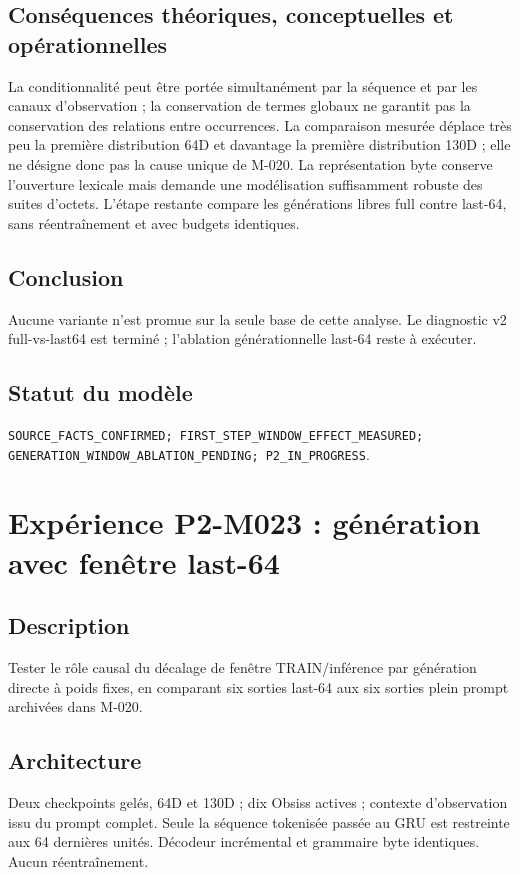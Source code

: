 \documentclass[11pt,a4paper]{report}
\begin{document}
\subsection*{Conséquences théoriques, conceptuelles et opérationnelles}
La conditionnalité peut être portée simultanément par la séquence et par les canaux d'observation ; la conservation de termes globaux ne garantit pas la conservation des relations entre occurrences. La comparaison mesurée déplace très peu la première distribution 64D et davantage la première distribution 130D ; elle ne désigne donc pas la cause unique de M-020. La représentation byte conserve l'ouverture lexicale mais demande une modélisation suffisamment robuste des suites d'octets. L'étape restante compare les générations libres full contre last-64, sans réentraînement et avec budgets identiques.
\subsection*{Conclusion}
Aucune variante n'est promue sur la seule base de cette analyse. Le diagnostic v2 full-vs-last64 est terminé ; l'ablation générationnelle last-64 reste à exécuter.
\subsection*{Statut du modèle}
\texttt{SOURCE\_FACTS\_CONFIRMED; FIRST\_STEP\_WINDOW\_EFFECT\_MEASURED;}\\
\texttt{GENERATION\_WINDOW\_ABLATION\_PENDING; P2\_IN\_PROGRESS}.



\section*{Expérience P2-M023 : génération avec fenêtre last-64}
\subsection*{Description}
Tester le rôle causal du décalage de fenêtre TRAIN/inférence par génération directe à poids fixes, en comparant six sorties last-64 aux six sorties plein prompt archivées dans M-020.
\subsection*{Architecture}
Deux checkpoints gelés, 64D et 130D ; dix Obsiss actives ; contexte d'observation issu du prompt complet. Seule la séquence tokenisée passée au GRU est restreinte aux 64 dernières unités. Décodeur incrémental et grammaire byte identiques. Aucun réentraînement.
\end{document}
